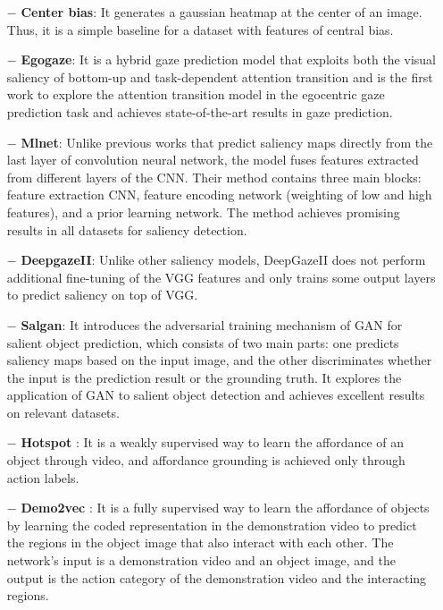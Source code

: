 \documentclass[journal,twoside]{IEEEtran}
\begin{document}
\begin{itemize}

\item [$\bm{-}$] 
\textbf{Center bias}: It generates a gaussian heatmap at the center of an image. Thus, it is a simple baseline for a dataset with features of central bias. 

\item [$\bm{-}$] 
\textbf{Egogaze}\cite{DBLP:conf/eccv/HuangCLS18}: It is a hybrid gaze prediction model that exploits both the visual saliency of bottom-up and task-dependent attention transition and is the first work to explore the attention transition model in the egocentric gaze prediction task and achieves state-of-the-art results in gaze prediction.

\item [$\bm{-}$] 
\textbf{Mlnet}\cite{DBLP:conf/icpr/CorniaBSC16}: Unlike previous works that predict saliency maps directly from the last layer of convolution neural network, the model fuses features extracted from different layers of the CNN. Their method contains three main blocks: feature extraction CNN, feature encoding network (weighting of low and high features), and a prior learning network. The method achieves promising results in all datasets for saliency detection.

\item [$\bm{-}$]
\textbf{DeepgazeII}\cite{DBLP:journals/corr/KummererWB16}: Unlike other saliency models, DeepGazeII does not perform additional fine-tuning of the VGG features and only trains some output layers to predict saliency on top of VGG.

\item [$\bm{-}$]
\textbf{Salgan}\cite{Pan_2017_SalGAN}: It introduces the adversarial training mechanism of GAN for salient object prediction, which consists of two main parts: one predicts saliency maps based on the input image, and the other discriminates whether the input is the prediction result or the grounding truth. It explores the application of GAN to salient object detection and achieves excellent results on relevant datasets. 

\item [$\bm{-}$]
\textbf{Hotspot} \cite{interaction-hotspots}: It is a weakly supervised way to learn the affordance of an object through video, and affordance grounding is achieved only through action labels. 

\item [$\bm{-}$]
\textbf{Demo2vec} \cite{demo2vec2018cvpr}: It is a fully supervised way to learn the affordance of objects by learning the coded representation in the demonstration video to predict the regions in the object image that also interact with each other. The network's input is a demonstration video and an object image, and the output is the action category of the demonstration video and the interacting regions.


\end{itemize}
\end{document}
